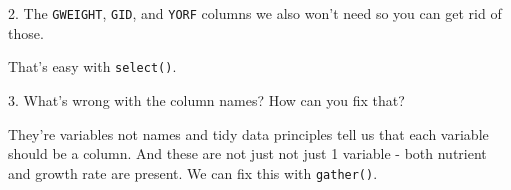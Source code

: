 \documentclass[]{book}
\newenvironment{Shaded}{\begin{snugshade}}{\end{snugshade}}
\newcommand{\CharTok}[1]{\textcolor[rgb]{0.31,0.60,0.02}{#1}}
\newcommand{\DataTypeTok}[1]{\textcolor[rgb]{0.13,0.29,0.53}{#1}}
\newcommand{\KeywordTok}[1]{\textcolor[rgb]{0.13,0.29,0.53}{\textbf{#1}}}
\newcommand{\NormalTok}[1]{#1}
\newcommand{\OperatorTok}[1]{\textcolor[rgb]{0.81,0.36,0.00}{\textbf{#1}}}
\newcommand{\StringTok}[1]{\textcolor[rgb]{0.31,0.60,0.02}{#1}}
\begin{document}
\begin{Shaded}
\end{Shaded}

2. The \texttt{GWEIGHT}, \texttt{GID}, and \texttt{YORF} columns we also won't need so you can get rid of those.

That's easy with \texttt{select()}.

\begin{Shaded}
\end{Shaded}

3. What's wrong with the column names? How can you fix that?

They're variables not names and tidy data principles tell us that each variable should be a column. And these are not just not just 1 variable - both nutrient and growth rate are present. We can fix this with \texttt{gather()}.
\end{document}

